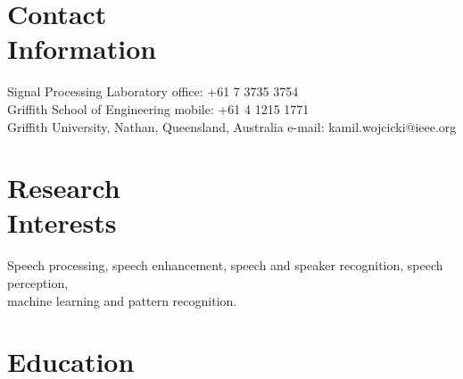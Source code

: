\documentclass[margin,line]{resume}
\begin{document}
\begin{resume}

    \section{\mysidestyle Contact\\Information}

    Signal Processing Laboratory                            \hfill  office: +61 7 3735 3754          \vspace{0mm}\\\vspace{0mm}%
    Griffith School of Engineering                          \hfill mobile: +61 4 1215 1771          \vspace{0mm}\\\vspace{0mm}%
    Griffith University, Nathan, Queensland, Australia      \hfill e-mail: kamil.wojcicki@ieee.org  \vspace{0mm}\\\vspace{-4.5mm}%


    \section{\mysidestyle Research\\Interests}

    Speech processing, speech enhancement, speech and speaker recognition, speech perception, \\ 
    machine learning and pattern recognition.


    \section{\mysidestyle Education}


\end{resume}
\end{document}

